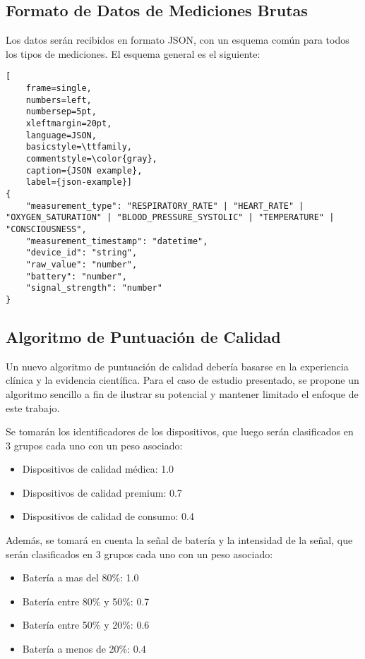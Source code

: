 \subsection{Formato de Datos de Mediciones Brutas}

Los datos serán recibidos en formato JSON, con un esquema común para todos los tipos de mediciones.
El esquema general es el siguiente:
\begin{lstlisting}[
    frame=single,
    numbers=left,
    numbersep=5pt,
    xleftmargin=20pt,
    language=JSON,
    basicstyle=\ttfamily,
    commentstyle=\color{gray},
    caption={JSON example},
    label={json-example}]
{
    "measurement_type": "RESPIRATORY_RATE" | "HEART_RATE" | "OXYGEN_SATURATION" | "BLOOD_PRESSURE_SYSTOLIC" | "TEMPERATURE" | "CONSCIOUSNESS",
    "measurement_timestamp": "datetime",
    "device_id": "string",
    "raw_value": "number",
    "battery": "number",
    "signal_strength": "number"
}
\end{lstlisting}
\newpage

\subsection{Algoritmo de Puntuación de Calidad}
Un nuevo algoritmo de puntuación de calidad debería basarse en la experiencia clínica y la evidencia científica. Para el caso de estudio presentado, 
se propone un algoritmo sencillo a fin de ilustrar su potencial y mantener limitado el enfoque de este trabajo.

Se tomarán los identificadores de los dispositivos, que luego serán clasificados en 3 grupos cada uno con un peso asociado: 
\begin{itemize}
    \item Dispositivos de calidad médica: 1.0
    \item Dispositivos de calidad premium: 0.7
    \item Dispositivos de calidad de consumo: 0.4
\end{itemize}

Además, se tomará en cuenta la señal de batería y la intensidad de la señal, que serán clasificados en 3 grupos cada uno con un peso asociado:
\begin{itemize}
    \item Batería a mas del 80\%: 1.0
    \item Batería entre 80\% y 50\%: 0.7
    \item Batería entre 50\% y 20\%: 0.6
    \item Batería a menos de 20\%: 0.4
\end{itemize}

